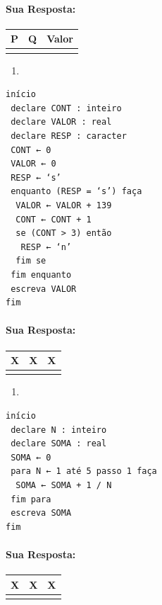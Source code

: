 \documentclass[12pt,a4paper]{article}
\begin{document}
    \hypertarget{sua-resposta}{%
\paragraph{Sua Resposta:}\label{sua-resposta}}

\begin{longtable}[]{@{}ccc@{}}
\toprule
P & Q & Valor\tabularnewline
\midrule
\endhead
& &\tabularnewline
\bottomrule
\end{longtable}

    \begin{enumerate}
\def\labelenumi{\alph{enumi})}
\setcounter{enumi}{5}
\item
\end{enumerate}

\begin{verbatim}
início
 declare CONT : inteiro
 declare VALOR : real
 declare RESP : caracter
 CONT ← 0
 VALOR ← 0
 RESP ← ‘s’
 enquanto (RESP = ‘s’) faça
  VALOR ← VALOR + 139
  CONT ← CONT + 1
  se (CONT > 3) então
   RESP ← ‘n’
  fim se
 fim enquanto
 escreva VALOR
fim
\end{verbatim}

    \hypertarget{sua-resposta}{%
\paragraph{Sua Resposta:}\label{sua-resposta}}

\begin{longtable}[]{@{}ccc@{}}
\toprule
X & X & X\tabularnewline
\midrule
\endhead
& &\tabularnewline
\bottomrule
\end{longtable}

    \begin{enumerate}
\def\labelenumi{\alph{enumi})}
\setcounter{enumi}{6}
\item
\end{enumerate}

\begin{verbatim}
início
 declare N : inteiro
 declare SOMA : real
 SOMA ← 0
 para N ← 1 até 5 passo 1 faça
  SOMA ← SOMA + 1 / N
 fim para
 escreva SOMA
fim
\end{verbatim}

    \hypertarget{sua-resposta}{%
\paragraph{Sua Resposta:}\label{sua-resposta}}

\begin{longtable}[]{@{}ccc@{}}
\toprule
X & X & X\tabularnewline
\midrule
\endhead
& &\tabularnewline
\bottomrule
\end{longtable}
\end{document}
